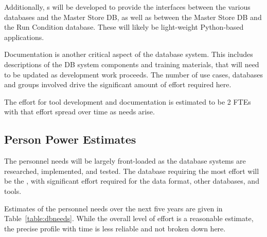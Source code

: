\documentclass[../main-v1.tex]{subfiles}
\begin{document}
Additionally, s will be developed to provide the interfaces between the various databases and the Master Store DB, as well as between the Master Store DB and the Run Condition database. These will likely be light-weight Python-based applications. 


Documentation is another critical aspect of the database system. This includes descriptions of the DB system components and training materials, that will need to be updated as development work proceeds. The number of use cases, databases and groups involved drive the significant amount of effort required here.

The effort for tool development and documentation is estimated to be 2 FTEs with that effort spread over time as needs arise.

\subsection{Person Power Estimates}

The personnel needs will be largely front-loaded as the database systems are researched, implemented, and tested. The database requiring the most effort will be the , with significant effort required for the data format, other databases, and tools.  

Estimates of the personnel needs over the next five years are given in Table~\ref{table:dbneeds}.  While the overall level of effort is a reasonable estimate, the precise profile with time is less reliable and not broken down here.
\end{document}
